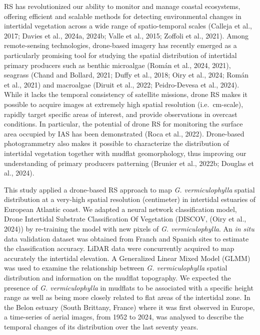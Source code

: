 \documentclass[
  letterpaper,
  11pt,
  english,
  singlespacing,
  headsepline]{MastersDoctoralThesis}
\begin{document}
\begin{spacing}{1.5}
RS has revolutionized our ability to monitor and manage coastal
ecosystems, offering efficient and scalable methods for detecting
environmental changes in intertidal vegetation across a wide range of
spatio-temporal scales (Calleja et al., 2017; Davies et al., 2024a,
2024b; Valle et al., 2015; Zoffoli et al., 2021). Among remote-sensing
technologies, drone-based imagery has recently emerged as a particularly
promising tool for studying the spatial distribution of intertidal
primary producers such as benthic microalgae (Román et al., 2024, 2021),
seagrass (Chand and Bollard, 2021; Duffy et al., 2018; Oiry et al.,
2024; Román et al., 2021) and macroalgae (Diruit et al., 2022;
Peidro-Devesa et al., 2024). While it lacks the temporal consistency of
satellite missions, drone RS makes it possible to acquire images at
extremely high spatial resolution (i.e.~cm-scale), rapidly target
specific areas of interest, and provide observations in overcast
conditions. In particular, the potential of drone RS for monitoring the
surface area occupied by IAS has been demonstrated (Roca et al., 2022).
Drone-based photogrammetry also makes it possible to characterize the
distribution of intertidal vegetation together with mudflat
geomorphology, thus improving our understanding of primary producers
patterning (Brunier et al., 2022b; Douglas et al., 2024).

This study applied a drone-based RS approach to map \emph{G.
vermiculophylla} spatial distribution at a very-high spatial resolution
(centimeter) in intertidal estuaries of European Atlantic coast. We
adapted a neural network classification model, Drone Intertidal
Substrate Classification Of Vegetation (DISCOV, (Oiry et al., 2024)) by
re-training the model with new pixels of \emph{G. vermiculophylla}. An
\emph{in situ} data validation dataset was obtained from Franch and
Spanish sites to estimate the classification accuracy. LiDAR data were
concurrently acquired to map accurately the intertidal elevation. A
Generalized Linear Mixed Model (GLMM) was used to examine the
relationship between \emph{G. vermiculophylla} spatial distribution and
information on the mudflat topography. We expected the presence of
\emph{G. vermiculophylla} in mudflats to be associated with a specific
height range as well as being more closely related to flat areas of the
intertidal zone. In the Belon estuary (South Brittany, France) where it
was first observed in Europe, a time-series of aerial images, from 1952
to 2024, was analysed to describe the temporal changes of its
distribution over the last seventy years.


\end{spacing}
\end{document}
